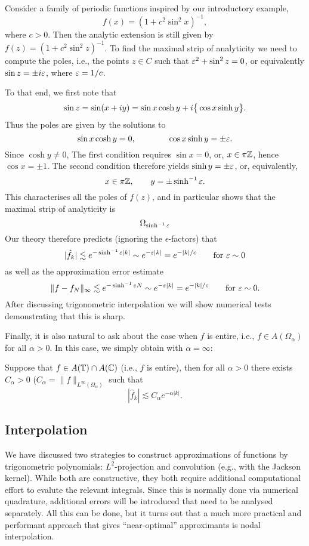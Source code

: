 \begin{example}
  Consider a family of periodic functions inspired by our introductory example,
  \[
    f(x) = (1 + c^2 \sin^2 x)^{-1},
  \]
  where $c > 0$. Then the analytic extension is still given by $f(z) = (1 + c^2
  \sin^2 z)^{-1}$. To find the maximal strip of analyticity we need to compute
  the poles, i.e., the points $z \in C$ such that $\varepsilon^2 + \sin^2 z = 0$, or
  equivalently $\sin z = \pm i \varepsilon$, where $\varepsilon = 1/c$.

  To that end, we first note that
  \[
    \sin z = \sin (x + i y) = \sin x \cosh y + i \big\{ \cos x \sinh y \big\}.
  \]
  Thus the poles are given by the solutions to
  \[
       \sin x \cosh y = 0, \qquad \qquad
       \cos x \sinh y = \pm \varepsilon.
  \]
  Since $\cosh y \neq 0$, The first condition requires $\sin x = 0$, or,
  $x \in \pi \mathbb{Z}$, hence $\cos x = \pm 1$. The second condition therefore
  yields $\sinh y = \pm \varepsilon$, or, equivalently,
  \[
      x \in \pi \mathbb{Z}, \qquad y = \pm \sinh^{-1} \varepsilon.
  \]
  This characterises all the poles of $f(z)$, and in particular shows that
  the maximal strip of analyticity is
  \[
      \Omega_{\sinh^{-1} \varepsilon}
  \]
  Our theory therefore predicts (ignoring the $\epsilon$-factors) that
  \[
      |\hat{f}_k| \lesssim e^{- \sinh^{-1} \varepsilon |k|}
            \sim e^{- \varepsilon |k|} = e^{-|k|/c} \qquad \text{for $\varepsilon \sim 0$}
  \]
  as well as the approximation error estimate
  \[
      \| f - f_N \|_\infty \lesssim e^{- \sinh^{-1} \varepsilon N} \sim e^{- \varepsilon |k|}
      = e^{-|k|/c}
      \qquad \text{for $\varepsilon \sim 0$.}
  \]
  After discussing trigonometric interpolation we will show numerical
  tests demonstrating that this is sharp.
\end{example}


Finally, it is also natural to ask about the case when $f$ is entire, i.e.,
$f \in A(\Omega_\alpha)$ for all $\alpha > 0$. In this case, we simply
obtain  with $\alpha = \infty$:

\begin{corollary} \label{th:trig:pw-entire}
  Suppose that $f \in A(\mathbb{T}) \cap A(\mathbb{C})$  (i.e., $f$ is entire), then for all
  $\alpha > 0$ there exists $C_\alpha > 0$ ($C_\alpha =
  \|f\|_{L^\infty(\Omega_\alpha)}$ such that
  \[
      |\hat{f}_k| \lesssim C_\alpha e^{-\alpha |k|}.
  \]
\end{corollary}



\subsection{Interpolation}
%
\label{sec:trig:interp}
%
We have discussed two strategies to construct approximations of functions by
trigonometric polynomials: $L^2$-projection and convolution (e.g., with the
Jackson kernel). While both are constructive, they both require additional 
computational effort to evalute the relevant integrals. Since this is normally 
done via numerical quadrature, additional errors will be introduced that 
need to be analysed separately. All this can be done, but it turns out that 
a much more practical and performant approach that gives ``near-optimal''
approximants is nodal interpolation.

